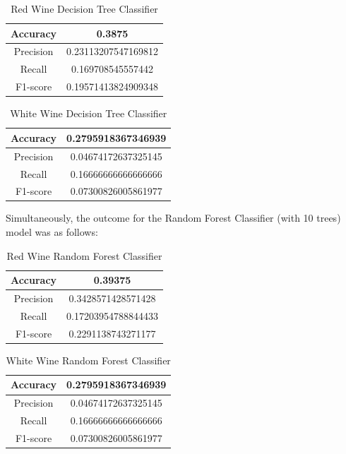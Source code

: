 \documentclass{ufazreport}
\begin{document}
\begin{table}[H]
    \centering
    \begin{tabular}{|c|c|}
        \hline
        Accuracy & 0.3875     \\
        \hline
        Precision & 0.23113207547169812     \\
        \hline
        Recall & 0.169708545557442 \\
        \hline
        F1-score & 0.19571413824909348 \\
        \hline      
    \end{tabular}
    \caption{Red Wine Decision Tree Classifier}
    \label{tab:my_label}
\end{table}
\begin{table}[H]
    \centering
    \begin{tabular}{|c|c|}
        \hline
        Accuracy & 0.2795918367346939     \\
        \hline
        Precision & 0.04674172637325145     \\
        \hline
        Recall & 0.16666666666666666 \\
        \hline
        F1-score & 0.07300826005861977 \\
        \hline      
    \end{tabular}
    \caption{White Wine Decision Tree Classifier}
    \label{tab:my_label}
\end{table}

Simultaneously, the outcome for the Random Forest Classifier (with 10 trees) model was as follows:
\begin{table}[H]
    \centering
    \begin{tabular}{|c|c|}
        \hline
        Accuracy & 0.39375    \\
        \hline
        Precision & 0.3428571428571428     \\
        \hline
        Recall & 0.17203954788844433 \\
        \hline
        F1-score & 0.2291138743271177 \\
        \hline      
    \end{tabular}
    \caption{Red Wine Random Forest Classifier}
    \label{tab:my_label}
\end{table}

\begin{table}[H]
    \centering
    \begin{tabular}{|c|c|}
        \hline
        Accuracy & 0.2795918367346939     \\
        \hline
        Precision & 0.04674172637325145     \\
        \hline
        Recall & 0.16666666666666666 \\
        \hline
        F1-score & 0.07300826005861977 \\
        \hline      
    \end{tabular}
    \caption{White Wine Random Forest Classifier}
    \label{tab:my_label}
\end{table}
\end{document}
